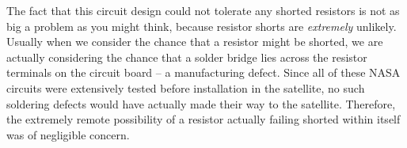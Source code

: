 The fact that this circuit design could not tolerate any shorted resistors is not as big a problem as you might think, because resistor shorts are {\it extremely} unlikely.  Usually when we consider the chance that a resistor might be shorted, we are actually considering the chance that a solder bridge lies across the resistor terminals on the circuit board -- a manufacturing defect.  Since all of these NASA circuits were extensively tested before installation in the satellite, no such soldering defects would have actually made their way to the satellite.  Therefore, the extremely remote possibility of a resistor actually failing shorted within itself was of negligible concern.




